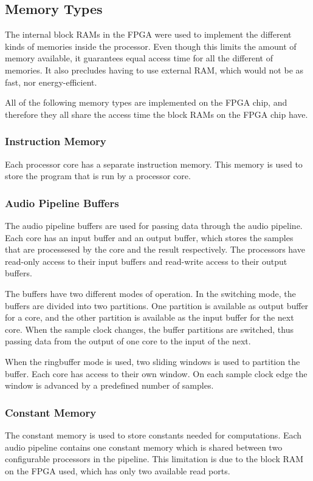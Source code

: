 
\subsection{Memory Types}\label{subsec:fpga-memory}

The internal block RAMs in the FPGA were used to implement the different kinds
of memories inside the processor. Even though this limits the amount of
memory available, it guarantees equal access time for all the different
of memories. It also precludes having to use external RAM, which would not be as
fast, nor energy-efficient.

All of the following memory types are implemented on the FPGA chip, and
therefore they all share the access time the block RAMs on the FPGA chip have.

\subsubsection{Instruction Memory}
Each processor core has a separate instruction memory. This memory is used to
store the program that is run by a processor core.

\subsubsection{Audio Pipeline Buffers}
The audio pipeline buffers are used for passing data through the audio pipeline.
Each core has an input buffer and an output buffer, which stores the samples
that are processesed by the core and the result respectively. The processors
have read-only access to their input buffers and read-write access to their
output buffers.

The buffers have two different modes of operation. In the switching mode,
the buffers are divided into two partitions. One partition is available
as output buffer for a core, and the other partition is available as the
input buffer for the next core. When the sample clock 
changes, the buffer partitions are switched, thus passing data from the
output of one core to the input of the next.

When the ringbuffer mode is used, two sliding windows is used to partition
the buffer. Each core has access to their own window. On each sample clock
edge  the window is advanced by a predefined number
of samples.

\subsubsection{Constant Memory}
The constant memory is used to store constants needed for computations. Each
audio pipeline contains one constant memory which is shared between two
configurable processors in the pipeline. This limitation is due to the block
RAM on the FPGA used, which has only two available read ports.

